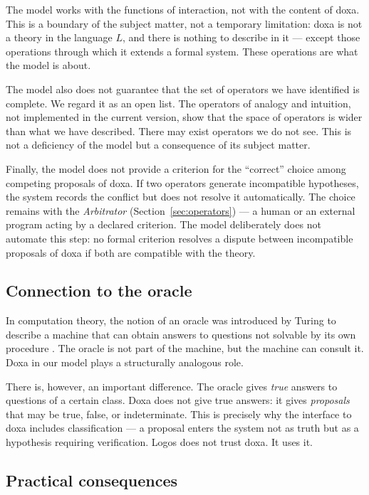 \documentclass[12pt,a4paper]{article}
\begin{document}
The model works with the functions of interaction, not with the content of
doxa. This is a boundary of the subject matter, not a temporary limitation:
doxa is not a theory in the language $L$, and there is nothing to describe in
it --- except those operations through which it extends a formal system. These
operations are what the model is about.

The model also does not guarantee that the set of operators we have identified
is complete. We regard it as an open list. The operators of analogy and
intuition, not implemented in the current version, show that the space of
operators is wider than what we have described. There may exist operators we
do not see. This is not a deficiency of the model but a consequence of its
subject matter.

Finally, the model does not provide a criterion for the ``correct'' choice
among competing proposals of doxa. If two operators generate incompatible
hypotheses, the system records the conflict but does not resolve it
automatically. The choice remains with the \emph{Arbitrator}
(Section~\ref{sec:operators}) --- a human or an external program acting by a
declared criterion. The model deliberately does not automate this step: no
formal criterion resolves a dispute between incompatible proposals of doxa if
both are compatible with the theory.

\subsection{Connection to the oracle}
\label{sec:oracle}

In computation theory, the notion of an oracle was introduced by Turing to
describe a machine that can obtain answers to questions not solvable by its
own procedure \cite{turing39}. The oracle is not part of the machine, but the
machine can consult it. Doxa in our model plays a structurally analogous role.

There is, however, an important difference. The oracle gives \emph{true}
answers to questions of a certain class. Doxa does not give true answers: it
gives \emph{proposals} that may be true, false, or indeterminate. This is
precisely why the interface to doxa includes classification --- a proposal
enters the system not as truth but as a hypothesis requiring verification.
Logos does not trust doxa. It uses it.

\subsection{Practical consequences}
\label{sec:practice}
\end{document}
